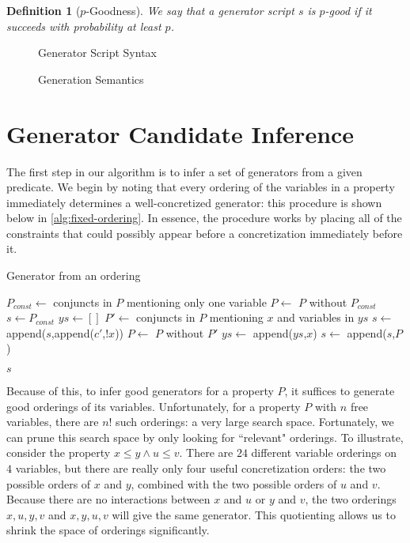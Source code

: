 \documentclass[10pt,a4paper]{article}
\newtheorem{definition}{Definition}
\begin{document}
\begin{definition}[$p$-Goodness]
We say that a generator script $s$ is $p$-good if it succeeds with probability at least $p$.
\end{definition}

\begin{figure}
\caption{Generator Script Syntax}
\label{fig:aluck-syntax}
\end{figure}

\begin{figure}
\caption{Generation Semantics}
\label{fig:aluck-semantics}
\end{figure}

\section{Generator Candidate Inference}
\label{sec:sci}
The first step in our algorithm is to infer a set of generators from a given predicate. We begin by noting that every ordering of the variables in a property immediately determines a well-concretized generator: this procedure is shown below in \autoref{alg:fixed-ordering}. In essence, the procedure works by placing all of the constraints that could possibly appear before a concretization immediately before it.

\begin{algorithm}
    \caption{Generator from an ordering}
    \label{alg:fixed-ordering}
    \begin{algorithmic}
       \State $P_{const} \gets$ conjuncts in $P$ mentioning only one variable
       \State $P \gets$ $P$ without $P_{const}$
       \State $s \gets P_{const}$ 
       \State $ys \gets []$ 
         \State $P' \gets$ conjuncts in $P$ mentioning $x$ and variables in $ys$
         \State $s \gets$ append($s$,append($c'$,$!x$))
         \State $P \gets$ $P$ without $P'$
         \State $ys \gets$ append($ys$,$x$)
       \EndFor
       \State $s \gets$ append($s$,$P$)
       
       \Return $s$
      \EndFunction
    \end{algorithmic}
\end{algorithm}


Because of this, to infer good generators for a property $P$, it suffices to generate good orderings of its variables. Unfortunately, for a property $P$ with $n$ free variables, there are $n!$ such orderings: a very large search space. Fortunately, we can prune this search space by only looking for ``relevant" orderings. To illustrate, consider the property $x \leq y \wedge u \leq v$. There are $24$ different variable orderings on $4$ variables, but there are really only four useful concretization orders: the two possible orders of $x$ and $y$, combined with the two possible orders of $u$ and $v$. Because there are no interactions between $x$ and $u$ or $y$ and $v$, the two orderings $x,u,y,v$ and $x,y,u,v$ will give the same generator. This quotienting allows us to shrink the space of orderings significantly.
\end{document}

